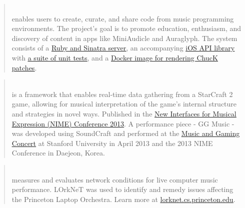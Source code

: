 

\begin{cvparagraph}


\begin{quote}
\\\leading{13pt} 
enables users to create, curate, and share code from music programming environments.
The project's goal is to promote education, enthusiasm, and discovery of content in apps like MiniAudicle and Auraglyph.
The system consists of a \href{https://github.com/markcerqueira/chuckpad-social}{\underline{Ruby and Sinatra server}},
an accompanying \href{https://github.com/markcerqueira/chuckpad-social-ios}{\underline{iOS API library}} with 
\href{https://github.com/markcerqueira/hello-chuckpad}{\underline{a suite of unit tests}},
and a \href{https://github.com/markcerqueira/chuck-renderer}{\underline{Docker image for rendering ChucK patches}}.
\end{quote}

\begin{quote}
\\\leading{13pt}
is a framework that enables real-time data gathering from a StarCraft 2 game, allowing for musical interpretation of the game’s internal structure and strategies in novel ways.
Published in the \href{http://www.nime.org/proceedings/2013/nime2013_146.pdf}{\underline{New Interfaces for Musical Expression (NIME) Conference 2013}}.
A performance piece - GG Music - was developed using SoundCraft and performed at the \href{https://www.youtube.com/watch?v=WisMhY5BWa4}{\underline{Music and Gaming Concert}} at Stanford University in April 2013 and the 2013 NIME Conference in Daejeon, Korea.
\end{quote}

\begin{quote}
\\\leading{13pt}
measures and evaluates network conditions for live computer music performance.
LOrkNeT was used to identify and remedy issues affecting the Princeton Laptop Orchestra.
Learn more at \href{lorknet.cs.princeton.edu}{\underline{lorknet.cs.princeton.edu}}.
\end{quote}

\end{cvparagraph}
